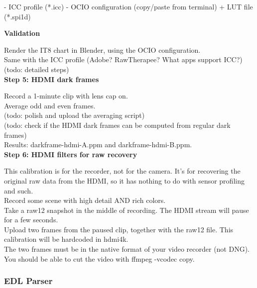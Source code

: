 {- ICC profile (*.icc)
- OCIO configuration (copy/paste from terminal) + LUT file (*.spi1d) 

\textbf{Validation}

Render the IT8 chart in Blender, using the OCIO configuration.\\

Same with the ICC profile (Adobe? RawTherapee? What apps support ICC?)\\

(todo: detailed steps)\\

\textbf{Step 5: HDMI dark frames }

Record a 1-minute clip with lens cap on.\\

Average odd and even frames.\\

(todo: polish and upload the averaging script)\\

(todo: check if the HDMI dark frames can be computed from regular dark frames)\\

Results: darkframe-hdmi-A.ppm and darkframe-hdmi-B.ppm.\\

\textbf{Step 6: HDMI filters for raw recovery }

This calibration is for the recorder, not for the camera. It's for recovering the original raw data from the HDMI, so it has nothing to do with sensor profiling and such.\\

Record some scene with high detail AND rich colors.\\

Take a raw12 snapshot in the middle of recording. The HDMI stream will pause for a few seconds.\\

Upload two frames from the paused clip, together with the raw12 file. This calibration will be hardcoded in hdmi4k.\\

The two frames must be in the native format of your video recorder (not DNG). You should be able to cut the video with ffmpeg -vcodec copy. 



\subsubsection{EDL Parser}
}
